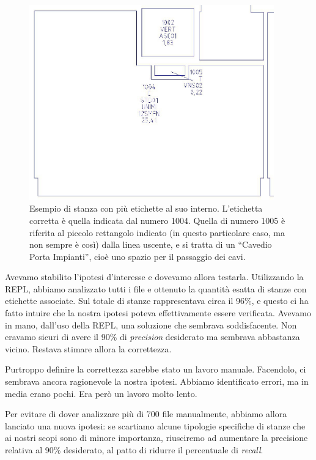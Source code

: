 \documentclass[12pt]{report}
\begin{document}
\begin{figure}[H]
    \centering
    \includegraphics[width=300pt]{03-dxf-stanza-etichette-fuori.jpg}
    \caption{Esempio di stanza con più etichette al suo interno. L'etichetta 
    corretta è quella indicata dal numero 1004. Quella di numero 1005 è
    riferita al piccolo rettangolo indicato (in questo particolare caso,
    ma non sempre è così) dalla linea uscente, e si tratta di
	un ``Cavedio Porta Impianti'', cioè uno spazio per il passaggio dei cavi.
	}
    \label{fig:dxf_room_labels}
\end{figure}

Avevamo stabilito l'ipotesi d'interesse e dovevamo allora testarla.
Utilizzando la REPL, abbiamo analizzato tutti i file e ottenuto
la quantità esatta di stanze con etichette associate. Sul totale di
stanze rappresentava circa il 96\%, e questo ci ha fatto intuire che
la nostra ipotesi poteva effettivamente essere verificata.
Avevamo in mano, dall'uso della REPL, una soluzione che sembrava 
soddisfacente. Non eravamo sicuri di avere il 90\% di \textit{precision}
desiderato ma sembrava abbastanza vicino. Restava stimare allora
la correttezza.

Purtroppo definire la correttezza sarebbe stato un lavoro manuale. Facendolo,
ci sembrava ancora ragionevole la nostra ipotesi. Abbiamo identificato errori,
ma in media erano pochi. Era però un lavoro molto lento.

Per evitare di dover analizzare più di 700 file manualmente,
abbiamo allora lanciato una nuova ipotesi: se scartiamo alcune
tipologie specifiche di stanze che ai nostri scopi sono di minore
importanza, riusciremo ad aumentare la precisione relativa al 90\%
desiderato, al patto di ridurre il percentuale di \textit{recall}.
\end{document}
